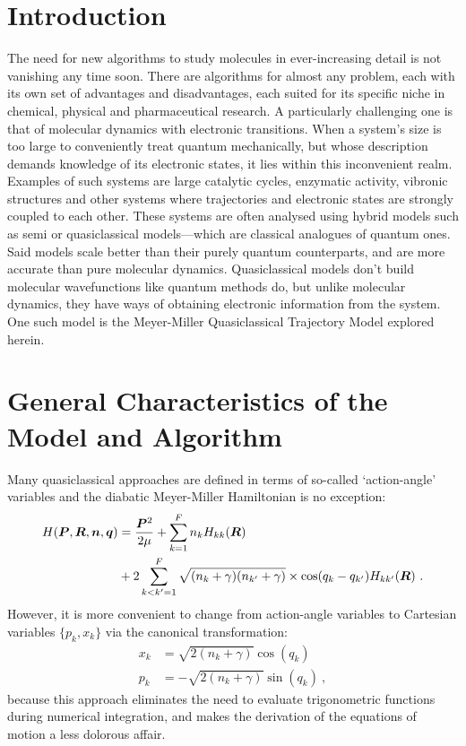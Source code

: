 \begin{center}\end{center}
\section*{Introduction}
%
The need for new algorithms to study molecules in ever-increasing detail is not vanishing any time soon. There are algorithms for almost any problem, each with its own set of advantages and disadvantages, each suited for its specific niche in chemical, physical and pharmaceutical research. A particularly challenging one is that of molecular dynamics with electronic transitions. When a system's size is too large to conveniently treat quantum mechanically, but whose description demands knowledge of its electronic states, it lies within this inconvenient realm. Examples of such systems are large catalytic cycles, enzymatic activity, vibronic structures and other systems where trajectories and electronic states are strongly coupled to each other. These systems are often analysed using hybrid models such as semi or quasiclassical models---which are classical analogues of quantum ones. Said models scale better than their purely quantum counterparts, and are more accurate than pure molecular dynamics. Quasiclassical models don't build molecular wavefunctions like quantum methods do, but unlike molecular dynamics, they have ways of obtaining electronic information from the system. One such model is the Meyer-Miller Quasiclassical Trajectory Model explored herein.
%
\section*{General Characteristics of the Model and Algorithm}
%
Many quasiclassical approaches are defined in terms of so-called `action-angle' variables and the diabatic Meyer-Miller Hamiltonian \cite{project} is no exception:
\begin{align}\label{e:aaham}
H(\bm{P},\bm{R},\bm{n},\bm{q}) &= \frac{\bm{P}^{2}}{2 \mu} + \sum\limits_{k=1}^{F} n_{k} H_{kk}(\bm{R}) \nonumber\\
& + 2 \sum\limits_{k<k'=1}^{F} \sqrt{(n_{k}+\gamma)(n_{k'}+\gamma)} \times \cos(q_{k}-q_{k'})H_{kk'}(\bm{R})~.
\end{align}
However, it is more convenient to change from action-angle variables to Cartesian variables $ \{p_{k},x_{k}\} $ via the canonical transformation:
\begin{subequations}
\begin{align}
x_{k} &= \sqrt{2(n_{k} + \gamma)} \cos(q_{k})\label{e:aatocar1}\\
p_{k} &= -\sqrt{2(n_{k} + \gamma)} \sin(q_{k})\label{e:aatocar2}~,
\end{align}
\end{subequations}
because this approach eliminates the need to evaluate trigonometric functions during numerical integration, and makes the derivation of the equations of motion a less dolorous affair.

